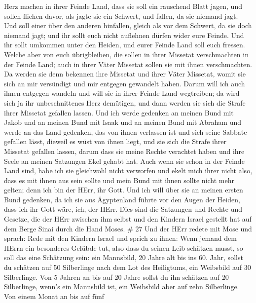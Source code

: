 Herz machen in ihrer Feinde Land, dass sie soll ein rauschend Blatt
jagen, und sollen fliehen davor, als jagte sie ein Schwert, und fallen,
da sie niemand jagt.  Und soll einer über den anderen
hinfallen, gleich als vor dem Schwert, da sie doch niemand jagt; und ihr
sollt euch nicht auflehnen dürfen wider eure Feinde.  Und
ihr sollt umkommen unter den Heiden, und eurer Feinde Land soll euch
fressen.  Welche aber von euch übrigbleiben, die sollen in
ihrer Missetat verschmachten in der Feinde Land; auch in ihrer Väter
Missetat sollen sie mit ihnen verschmachten.  Da werden sie
denn bekennen ihre Missetat und ihrer Väter Missetat, womit sie sich an
mir versündigt und mir entgegen gewandelt haben.  Darum
will ich auch ihnen entgegen wandeln und will sie in ihrer Feinde Land
wegtreiben; da wird sich ja ihr unbeschnittenes Herz demütigen, und dann
werden sie sich die Strafe ihrer Missetat gefallen lassen. 
Und ich werde gedenken an meinen Bund mit Jakob und an meinen Bund mit
Isaak und an meinen Bund mit Abraham und werde an das Land gedenken,
 das von ihnen verlassen ist und sich seine Sabbate
gefallen lässt, dieweil es wüst von ihnen liegt, und sie sich die Strafe
ihrer Missetat gefallen lassen, darum dass sie meine Rechte verachtet
haben und ihre Seele an meinen Satzungen Ekel gehabt hat. 
Auch wenn sie schon in der Feinde Land sind, habe ich sie gleichwohl
nicht verworfen und ekelt mich ihrer nicht also, dass es mit ihnen aus
sein sollte und mein Bund mit ihnen sollte nicht mehr gelten; denn ich
bin der HErr, ihr Gott.  Und ich will über sie an meinen
ersten Bund gedenken, da ich sie aus Ägyptenland führte vor den Augen
der Heiden, dass ich ihr Gott wäre, ich, der HErr.  Dies
sind die Satzungen und Rechte und Gesetze, die der HErr zwischen ihm
selbst und den Kindern Israel gestellt hat auf dem Berge Sinai durch die
Hand Moses. \# 27  Und der HErr redete mit Mose und sprach:
 Rede mit den Kindern Israel und sprich zu ihnen: Wenn
jemand dem HErrn ein besonderes Gelübde tut, also dass du seinen Leib
schätzen musst,  so soll das eine Schätzung sein: ein
Mannsbild, 20 Jahre alt bis ins 60. Jahr, sollst du schätzen auf 50
Silberlinge nach dem Lot des Heiligtums,  ein Weibsbild auf
30 Silberlinge.  Von 5 Jahren an bis auf 20 Jahre sollst du
ihn schätzen auf 20 Silberlinge, wenn's ein Mannsbild ist, ein Weibsbild
aber auf zehn Silberlinge.  Von einem Monat an bis auf fünf
